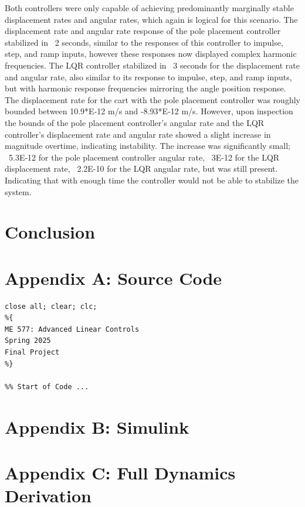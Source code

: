 \documentclass[titlepage]{article}
\begin{document}
Both controllers were only capable of achieving predominantly marginally stable displacement rates and angular rates, which again is logical for this scenario. The displacement rate and angular rate response of the pole placement controller stabilized in ~2 seconds, similar to the responses of this controller to impulse, step, and ramp inputs, however these responses now displayed complex harmonic frequencies. The LQR controller stabilized in ~3 seconds for the displacement rate and angular rate, also similar to its response to impulse, step, and ramp inputs, but with harmonic response frequencies mirroring the angle position response. The displacement rate for the cart with the pole placement controller was roughly bounded between 10.9*E-12 m/s and -8.93*E-12 m/s. However, upon inspection the bounds of the pole placement controller’s angular rate and the LQR controller’s displacement rate and angular rate showed a slight increase in magnitude overtime, indicating instability. The increase was significantly small; ~5.3E-12 for the pole placement controller angular rate, ~3E-12 for the LQR displacement rate, ~2.2E-10 for the LQR angular rate, but was still present. Indicating that with enough time the controller would not be able to stabilize the system.

\newpage
\section{Conclusion}

\newpage
\section{Appendix A: Source Code}
\begin{lstlisting}[style=Matlab-editor]
close all; clear; clc;
%{
ME 577: Advanced Linear Controls
Spring 2025
Final Project
%}

%% Start of Code ...

\end{lstlisting}

\newpage
\section{Appendix B: Simulink}

\newpage
\section{Appendix C: Full Dynamics Derivation}
\end{document}
